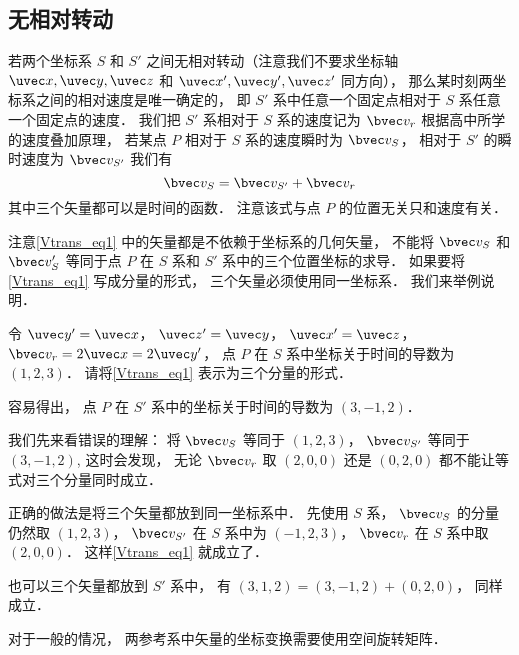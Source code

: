 


\subsection{无相对转动}
若两个坐标系 $S$ 和 $S'$ 之间无相对转动（注意我们不要求坐标轴 $\uvec x, \uvec y, \uvec z$ 和 $\uvec x', \uvec y', \uvec z'$ 同方向）， 那么某时刻两坐标系之间的相对速度是唯一确定的， 即 $S'$ 系中任意一个固定点相对于 $S$ 系任意一个固定点的速度． 我们把 $S'$ 系相对于 $S$ 系的速度记为 $\bvec v_r$ 根据高中所学的速度叠加原理， 若某点 $P$ 相对于 $S$ 系的速度瞬时为 $\bvec v_S$， 相对于 $S'$ 的瞬时速度为 $\bvec v_{S'}$ 我们有
\begin{equation}\label{Vtrans_eq1}
\bvec v_{S} = \bvec v_{S'} + \bvec v_r
\end{equation}
其中三个矢量都可以是时间的函数． 注意该式与点 $P$ 的位置无关只和速度有关．

注意\autoref{Vtrans_eq1} 中的矢量都是不依赖于坐标系的几何矢量， 不能将 $\bvec v_S$ 和 $\bvec v_S'$ 等同于点 $P$ 在 $S$ 系和 $S'$ 系中的三个位置坐标的求导． 如果要将\autoref{Vtrans_eq1} 写成分量的形式， 三个矢量必须使用同一坐标系． 我们来举例说明．

\begin{example}{}\label{Vtrans_ex2}
令 $\uvec y' = \uvec x$， $\uvec z' = \uvec y$， $\uvec x' = \uvec z$， $\bvec v_r = 2\uvec x = 2\uvec y'$， 点 $P$ 在 $S$ 系中坐标关于时间的导数为 $(1, 2, 3)$． 请将\autoref{Vtrans_eq1} 表示为三个分量的形式．

容易得出， 点 $P$ 在 $S'$ 系中的坐标关于时间的导数为 $(3, -1, 2)$．

我们先来看错误的理解： 将 $\bvec v_S$ 等同于 $(1, 2, 3)$， $\bvec v_{S'}$ 等同于 $(3, -1, 2)$,  这时会发现， 无论 $\bvec v_r$ 取 $(2, 0, 0)$ 还是 $(0, 2, 0)$ 都不能让等式对三个分量同时成立．

正确的做法是将三个矢量都放到同一坐标系中． 先使用 $S$ 系， $\bvec v_S$ 的分量仍然取 $(1, 2, 3)$， $\bvec v_{S'}$ 在 $S$ 系中为 $(-1, 2, 3)$， $\bvec v_r$ 在 $S$ 系中取 $(2, 0, 0)$． 这样\autoref{Vtrans_eq1} 就成立了．

也可以三个矢量都放到 $S'$ 系中， 有 $(3, 1, 2) = (3, -1, 2) + (0, 2, 0)$， 同样成立．
\end{example}

对于一般的情况， 两参考系中矢量的坐标变换需要使用空间旋转矩阵．

